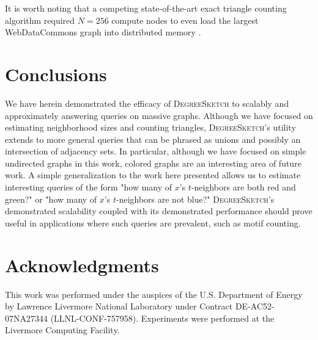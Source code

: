 \documentclass{vldb}
\newcommand{\algoname}[1]{\textnormal{\textsc{#1}}}
\begin{document}


It is worth noting that a competing state-of-the-art exact triangle counting algorithm required $N=256$ compute nodes to even load the largest WebDataCommons graph into distributed memory \cite{pearce2017triangle}.





\section{Conclusions}

We have herein demonstrated the efficacy of \algoname{DegreeSketch} to scalably and approximately answering queries on massive graphs. 
Although we have focused on estimating neighborhood sizes and counting triangles, \algoname{DegreeSketch}'s utility extends to more general queries that can be phrased as unions and possibly an intersection of adjacency sets. 
In particular, although we have focused on simple undirected graphs in this work, colored graphs are an interesting area of future work.
A simple generalization to the work here presented allows us to estimate interesting queries of the form "how many of $x$'s $t$-neighbors are both red and green?" or "how many of $x$'s $t$-neighbors are not blue?"
\algoname{DegreeSketch}'s demonstrated scalability coupled with its demonstrated performance should prove useful in applications where such queries are prevalent, such as motif counting.

\balance

\section{Acknowledgments}
This work was performed under the auspices of the U.S. Department of Energy by Lawrence Livermore National Laboratory under Contract DE-AC52-07NA27344 (LLNL-CONF-757958). 
Experiments were performed at the Livermore Computing Facility.
\end{document}
